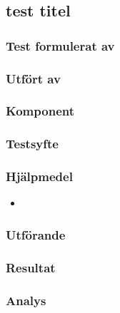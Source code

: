 \clearpage
\subsection{test titel}
\label{test:uinikIdentifiering}

\setlength{\columnsep}{1cm}




\begin{multicols}{2}
\subsubsection*{Test formulerat av}


\subsubsection*{Utfört av}



\end{multicols}
\subsubsection*{Komponent}



\subsubsection*{Testsyfte}



\subsubsection*{Hjälpmedel}
\begin{itemize}
	\item 
\end{itemize}



\subsubsection*{Utförande}



\subsubsection*{Resultat}



\subsubsection*{Analys}



